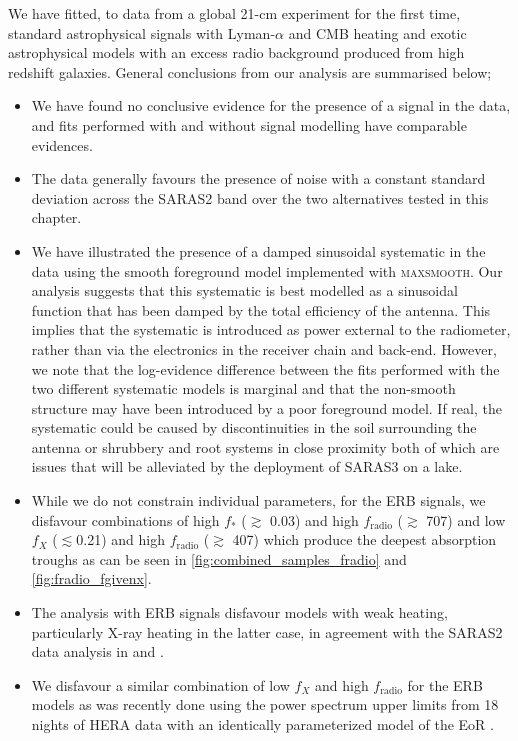 We have fitted, to data from a global 21-cm experiment for the first time, standard astrophysical signals with Lyman-$\alpha$ and CMB heating and exotic astrophysical models with an excess radio background produced from high redshift galaxies. General conclusions from our analysis are summarised below;

\begin{itemize}
    \item We have found no conclusive evidence for the presence of a signal in the data, and fits performed with and without signal modelling have comparable evidences.
    \item The data generally favours the presence of noise with a constant standard deviation across the SARAS2 band over the two alternatives tested in this chapter.
    \item We have illustrated the presence of a damped sinusoidal systematic in the data using the smooth foreground model implemented with \textsc{maxsmooth}. Our analysis suggests that this systematic is best modelled as a sinusoidal function that has been damped by the total efficiency of the antenna. This implies that the systematic is introduced as power external to the radiometer, rather than via the electronics in the receiver chain and back-end. However, we note that the log-evidence difference between the fits performed with the two different systematic models is marginal and that the non-smooth structure may have been introduced by a poor foreground model. If real, the systematic could be caused by discontinuities in the soil surrounding the antenna or shrubbery and root systems in close proximity both of which are issues that will be alleviated by the deployment of SARAS3 on a lake.
    \item While we do not constrain individual parameters, for the ERB signals, we disfavour combinations of high $f_*$ ($\gtrsim$ 0.03) and high $f_\mathrm{radio}$ ($\gtrsim$ 707) and low $f_X$ ($\lesssim$0.21) and high $f_\mathrm{radio}$ ($\gtrsim$ 407) which produce the deepest absorption troughs as can be seen in \cref{fig:combined_samples_fradio} and \cref{fig:fradio_fgivenx}.
    \item The analysis with ERB signals disfavour models with weak heating, particularly X-ray heating in the latter case, in agreement with the SARAS2 data analysis in \cite{Singh_saras2_2017} and \cite{Singh_saras2_2018}.
    \item We disfavour a similar combination of low $f_X$ and high $f_\mathrm{radio}$ for the ERB models as was recently done using the power spectrum upper limits from 18 nights of HERA data with an identically parameterized model of the EoR \citep{HERA_2022b}.
\end{itemize}

